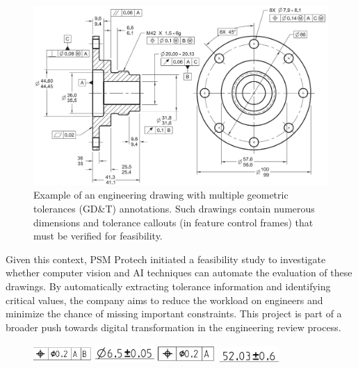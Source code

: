 \documentclass[11pt,a4paper]{article}
\begin{document}
\begin{figure}[h!]
\centering
\includegraphics[width=\textwidth]{GDD-Drawing-Example.png}
\caption{Example of an engineering drawing with multiple geometric tolerances (GD\&T) annotations. Such drawings contain numerous dimensions and tolerance callouts (in feature control frames) that must be verified for feasibility.}
\label{fig:example_drawing}
\end{figure}

Given this context, PSM Protech initiated a feasibility study to investigate whether computer vision and AI techniques can automate the evaluation of these drawings. By automatically extracting tolerance information and identifying critical values, the company aims to reduce the workload on engineers and minimize the chance of missing important constraints. This project is part of a broader push towards digital transformation in the engineering review process.
\begin{figure}[h!]
\centering
\includegraphics[width=0.2\textwidth]{45.png}
\includegraphics[width=0.2\textwidth]{46.png}
\includegraphics[width=0.2\textwidth]{47.png}
\includegraphics[width=0.2\textwidth]{60.png}
\label{fig:1}
\end{figure}
\end{document}
